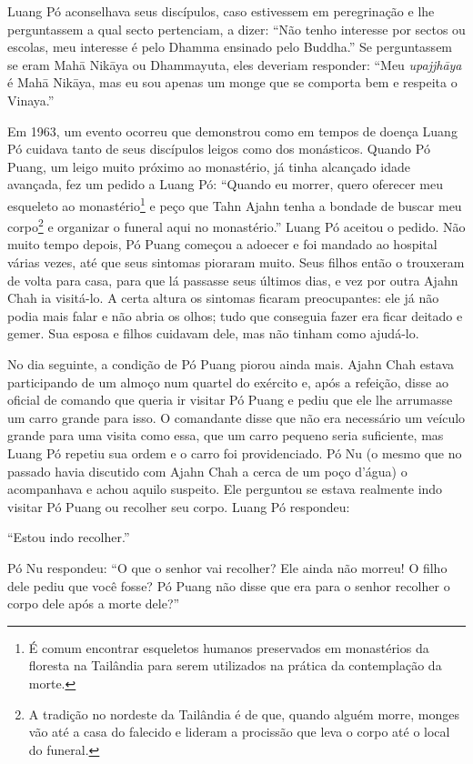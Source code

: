 Luang Pó aconselhava seus discípulos, caso estivessem em peregrinação e
lhe perguntassem a qual secto pertenciam, a dizer: ``Não tenho interesse
por sectos ou escolas, meu interesse é pelo Dhamma ensinado pelo
Buddha.'' Se perguntassem se eram Mahā Nikāya ou Dhammayuta, eles
deveriam responder: ``Meu \emph{upajjhāya} é Mahā Nikāya, mas eu sou
apenas um monge que se comporta bem e respeita o Vinaya.''

Em 1963, um evento ocorreu que demonstrou como em tempos de doença Luang
Pó cuidava tanto de seus discípulos leigos como dos monásticos. Quando
Pó Puang, um leigo muito próximo ao monastério, já tinha alcançado idade
avançada, fez um pedido a Luang Pó: ``Quando eu morrer, quero oferecer
meu esqueleto ao monastério\footnote{É comum encontrar esqueletos
  humanos preservados em monastérios da floresta na Tailândia para serem
  utilizados na prática da contemplação da morte.} e peço que Tahn Ajahn
tenha a bondade de buscar meu corpo\footnote{A tradição no nordeste da
  Tailândia é de que, quando alguém morre, monges vão até a casa do
  falecido e lideram a procissão que leva o corpo até o local do
  funeral.} e organizar o funeral aqui no monastério.'' Luang Pó aceitou
o pedido. Não muito tempo depois, Pó Puang começou a adoecer e foi
mandado ao hospital várias vezes, até que seus sintomas pioraram muito.
Seus filhos então o trouxeram de volta para casa, para que lá passasse
seus últimos dias, e vez por outra Ajahn Chah ia visitá-lo. A certa
altura os sintomas ficaram preocupantes: ele já não podia mais falar e
não abria os olhos; tudo que conseguia fazer era ficar deitado e gemer.
Sua esposa e filhos cuidavam dele, mas não tinham como ajudá-lo.

No dia seguinte, a condição de Pó Puang piorou ainda mais. Ajahn Chah
estava participando de um almoço num quartel do exército e, após a
refeição, disse ao oficial de comando que queria ir visitar Pó Puang e
pediu que ele lhe arrumasse um carro grande para isso. O comandante
disse que não era necessário um veículo grande para uma visita como
essa, que um carro pequeno seria suficiente, mas Luang Pó repetiu sua
ordem e o carro foi providenciado. Pó Nu (o mesmo que no passado havia
discutido com Ajahn Chah a cerca de um poço d'água) o acompanhava e
achou aquilo suspeito. Ele perguntou se estava realmente indo visitar Pó
Puang ou recolher seu corpo. Luang Pó respondeu:

``Estou indo recolher.''

Pó Nu respondeu: ``O que o senhor vai recolher? Ele ainda não morreu! O
filho dele pediu que você fosse? Pó Puang não disse que era para o
senhor recolher o corpo dele após a morte dele?''

